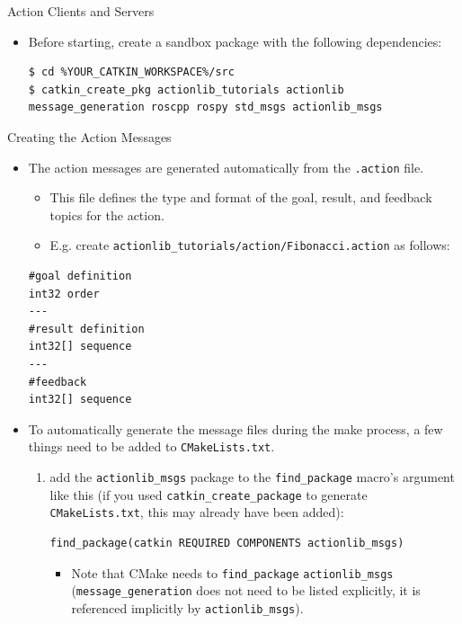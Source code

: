 \begin{frame}{Action Clients and Servers}
\begin{itemize}
  \item Before starting, create a sandbox package with the following dependencies:
\begin{lstlisting}[language=shell]
$ cd %YOUR_CATKIN_WORKSPACE%/src
$ catkin_create_pkg actionlib_tutorials actionlib message_generation roscpp rospy std_msgs actionlib_msgs
\end{lstlisting}
  
 \end{itemize}
\end{frame}

\begin{frame}{Creating the Action Messages}
 \begin{itemize}
  \item The action messages are generated automatically from the \texttt{.action} file. 
   \begin{itemize}
    \item This file defines the type and format of the goal, result, and feedback topics for the action. 
    \item E.g. create \texttt{actionlib\_tutorials/action/Fibonacci.action} as follows:
   \end{itemize}  
\begin{lstlisting}[language=syntax]  
#goal definition
int32 order
---
#result definition
int32[] sequence
---
#feedback
int32[] sequence
\end{lstlisting}  

  \framebreak
  
  \item To automatically generate the message files during the make process, a few things need to be added to \texttt{CMakeLists.txt}.
   \begin{enumerate}
    \item add the \texttt{actionlib\_msgs} package to the \texttt{find\_package} macro's argument like this (if you used \texttt{catkin\_create\_package} to generate \texttt{CMakeLists.txt}, this may already have been added):
\begin{lstlisting}[language=syntax]
find_package(catkin REQUIRED COMPONENTS actionlib_msgs)  
\end{lstlisting}  
     \begin{itemize}
      \item Note that CMake needs to \texttt{find\_package} \texttt{actionlib\_msgs} (\texttt{message\_generation} does not need to be listed explicitly, it is referenced implicitly by \texttt{actionlib\_msgs}).
     \end{itemize}
     

\end{enumerate}
\end{itemize}
\end{frame}

